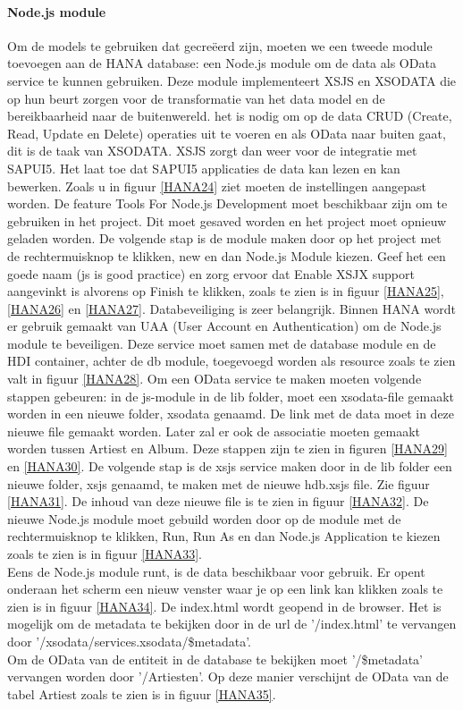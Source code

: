             \paragraph{Node.js module}
            Om de models te gebruiken dat gecreëerd zijn, moeten we een tweede module toevoegen aan de HANA database: een Node.js module om de data als OData service te kunnen gebruiken.
            Deze module implementeert XSJS en XSODATA die op hun beurt zorgen voor de transformatie van het data model en de bereikbaarheid naar de buitenwereld. het is nodig om op de data CRUD (Create, Read, Update en Delete) operaties uit te voeren en als OData naar buiten gaat, dit is de taak van XSODATA. XSJS zorgt dan weer voor de integratie met SAPUI5. Het laat toe dat SAPUI5 applicaties de data kan lezen en kan bewerken.
            Zoals u in figuur \ref{HANA24} ziet moeten de instellingen aangepast worden. De feature Tools For Node.js Development moet beschikbaar zijn om te gebruiken in het project. Dit moet gesaved worden en het project moet opnieuw geladen worden. De volgende stap is de module maken door op het project met de rechtermuisknop te klikken, new en dan Node.js Module kiezen. Geef het een goede naam (js is good practice) en zorg ervoor dat Enable XSJX support aangevinkt is alvorens op Finish te klikken, zoals te zien is in figuur \ref{HANA25}, \ref{HANA26} en \ref{HANA27}.
            Databeveiliging is zeer belangrijk. Binnen HANA wordt er gebruik gemaakt van UAA (User Account en Authentication) om de Node.js module te beveiligen. Deze service moet samen met de database module en de HDI container, achter de db module, toegevoegd worden als resource zoals te zien valt in figuur \ref{HANA28}.
            Om een OData service te maken moeten volgende stappen gebeuren: in de js-module in de lib folder, moet een xsodata-file gemaakt worden in een nieuwe folder, xsodata genaamd. De link met de data moet in deze nieuwe file gemaakt worden. Later zal er ook de associatie moeten gemaakt worden tussen Artiest en Album. Deze stappen zijn te zien in figuren \ref{HANA29} en \ref{HANA30}.
            De volgende stap is de xsjs service maken door in de lib folder een nieuwe folder, xsjs genaamd, te maken met de nieuwe hdb.xsjs file. Zie figuur \ref{HANA31}. De inhoud van deze nieuwe file is te zien in figuur \ref{HANA32}.
            De nieuwe Node.js module moet gebuild worden door op de module met de rechtermuisknop te klikken, Run, Run As en dan Node.js Application te kiezen zoals te zien is in figuur \ref{HANA33}.\\
            Eens de Node.js module runt, is de data beschikbaar voor gebruik. Er opent onderaan het scherm een nieuw venster waar je op een link kan klikken zoals te zien is in figuur \ref{HANA34}. De index.html wordt geopend in de browser. Het is mogelijk om de metadata te bekijken door in de url de '/index.html' te vervangen door '/xsodata/services.xsodata/\$metadata'.\\
            Om de OData van de entiteit in de database te bekijken moet '/\$metadata' vervangen worden door '/Artiesten'. Op deze manier verschijnt de OData van de tabel Artiest zoals te zien is in figuur \ref{HANA35}.
            
